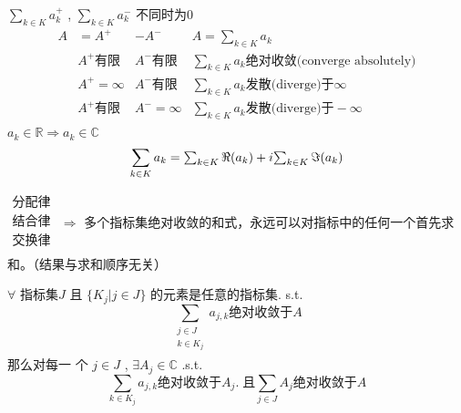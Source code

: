 $ \sum_{k\in K} a_k^+ $ ,
$ \sum_{k\in K} a_k^- $ 不同时为0
\begin{equation*}
    \begin{array}{llll}
        A &= A^+ &- A^- & A =  \sum_{k\in K} a_k \\ 
          &A^+\text{有限} & A^-\text{有限}& \sum_{k\in K} a_k \text{绝对收敛(converge absolutely)} \\
          &A^+=\infty & A^-\text{有限}& \sum_{k\in K} a_k \text{发散(diverge)于}\infty \\
          &A^+\text{有限} & A^-=\infty& \sum_{k\in K} a_k \text{发散(diverge)于}-\infty \\
    \end{array}
\end{equation*}
$ a_k\in\mathbb{R} \Rightarrow a_k\in\mathbb{C} $ 
\begin{equation*}
    \sum_{k\in K} a_k =
    \tikznode{akRe}{$ \sum_{k\in K} \Re{(a_k)} $ } +
    i\tikznode{akIm}{$ \sum_{k\in K} \Im{(a_k)} $ }    
\end{equation*}


$\begin{array}{l}
    \text{分配律}\\
    \text{结合律}\\
    \text{交换律}\\
\end{array}$
$ \Rightarrow $ 多个指标集绝对收敛的和式，永远可以对指标中的任何一个首先求和。（结果与求和顺序无关）

$ \forall $ 指标集$  J $  且 $ \{K_j|j\in J\} $  的元素是任意的指标集. s.t.
\begin{equation*}
    \sum_{
        \begin{array}{l}
            j\in J \\
            k\in K_j\\
        \end{array}}a_{j,k}
    \text{绝对收敛于}A
\end{equation*} 
那么对每一
个 $ j\in J $ , $ \exists A_j \in \mathbb{C} $ .s.t.
\begin{equation*}
    \sum_{k\in K_j}a_{j,k}
    \text{绝对收敛于}A_j. \;
    \text{且}\sum_{j\in J}A_j
    \text{绝对收敛于}A
\end{equation*}

